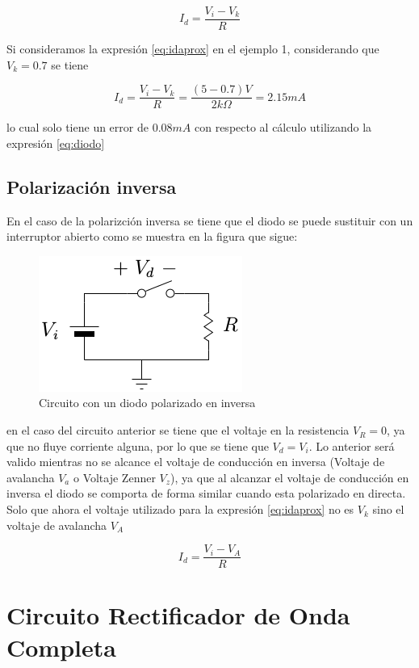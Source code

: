 \documentclass{article}
\begin{document}
\begin{equation}\label{eq:idaprox}
I_{d}=\frac{V_{i}-V_{k}}{R}
\end{equation}

Si consideramos la expresión \eqref{eq:idaprox} en el ejemplo 1,
considerando que $V_{k}=0.7$ se tiene

\[
I_{d}=\frac{V_{i}-V_{k}}{R}=\frac{(5-0.7)V}{2k \Omega }=2.15mA
\]

lo cual solo tiene un error de $0.08mA$ con respecto al cálculo
utilizando la expresión \eqref{eq:diodo}

\subsection{Polarización inversa}\label{polarizaciuxf3n-inversa}

En el caso de la polarizción inversa se tiene que el diodo se puede
sustituir con un interruptor abierto como se muestra en la figura que
sigue:

\begin{figure}[htbp]
\centering
\includegraphics{images/didodcinversa.png}
\caption{Circuito con un diodo polarizado en inversa}
\end{figure}

en el caso del circuito anterior se tiene que el voltaje en la
resistencia $V_{R}=0$, ya que no fluye corriente alguna, por lo que se
tiene que $V_{d}=V_{i}$. Lo anterior será valido mientras no se alcance
el voltaje de conducción en inversa (Voltaje de avalancha $V_{a}$ o
Voltaje Zenner $V_{z}$), ya que al alcanzar el voltaje de conducción en
inversa el diodo se comporta de forma similar cuando esta polarizado en
directa. Solo que ahora el voltaje utilizado para la expresión
\eqref{eq:idaprox} no es $V_{k}$ sino el voltaje de avalancha $V_{A}$

\begin{equation}\label{eq:idinversaaprox}
I_{d}=\frac{V_{i}-V_{A}}{R}
\end{equation}

    \section{Circuito Rectificador de Onda
Completa}\label{circuito-rectificador-de-onda-completa}
\end{document}
